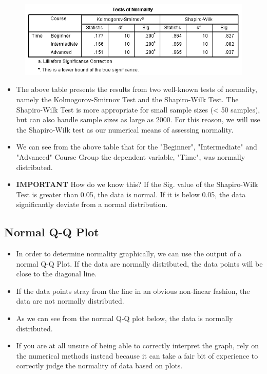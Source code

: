\documentclass[]{article}
\begin{document}
\begin{figure}
	\centering
	\includegraphics[width=0.7\linewidth]{Normality/normality-7}
	\caption{}
	\label{fig:normality-7}
\end{figure}
\begin{itemize}
	\item The above table presents the results from two well-known tests of normality, namely the Kolmogorov-Smirnov Test and the Shapiro-Wilk Test. The Shapiro-Wilk Test is more appropriate for small sample sizes (< 50 samples), but can also handle sample sizes as large as 2000. For this reason, we will use the Shapiro-Wilk test as our numerical means of assessing normality.
	
\item We can see from the above table that for the "Beginner", "Intermediate" and "Advanced" Course Group the dependent variable, "Time", was normally distributed.
\item \textbf{IMPORTANT }How do we know this? If the Sig. value of the Shapiro-Wilk Test is greater than 0.05, the data is normal. If it is below 0.05, the data significantly deviate from a normal distribution.
	
\end{itemize}


\subsection{Normal Q-Q Plot}
\begin{itemize}
	\item In order to determine normality graphically, we can use the output of a normal Q-Q Plot. If the data are normally distributed, the data points will be close to the diagonal line. 
	\item If the data points stray from the line in an obvious non-linear fashion, the data are not normally distributed. 
	\item As we can see from the normal Q-Q plot below, the data is normally distributed. 
	\item If you are at all unsure of being able to correctly interpret the graph, rely on the numerical methods instead because it can take a fair bit of experience to correctly judge the normality of data based on plots.
\end{itemize}
\end{document}
